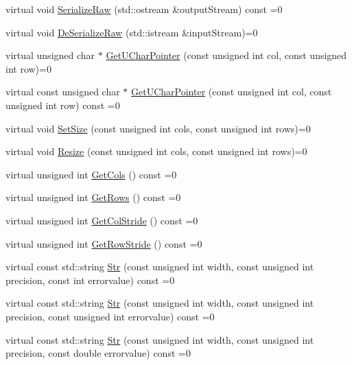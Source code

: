 \begin{DoxyCompactItemize}
\item 
virtual void \hyperlink{classsvl_sample_matrix_acd4b2584ba05baa047abebd0b074ce04}{Serialize\-Raw} (std\-::ostream \&output\-Stream) const =0
\item 
virtual void \hyperlink{classsvl_sample_matrix_aa57e6d8ca556b52e70b6e94e3e962cfd}{De\-Serialize\-Raw} (std\-::istream \&input\-Stream)=0
\item 
virtual unsigned char $\ast$ \hyperlink{classsvl_sample_matrix_a3796f625eb8a13b9ab34594c0bd6903f}{Get\-U\-Char\-Pointer} (const unsigned int col, const unsigned int row)=0
\item 
virtual const unsigned char $\ast$ \hyperlink{classsvl_sample_matrix_a85aed650f106fe6ba80a83c199f6e62b}{Get\-U\-Char\-Pointer} (const unsigned int col, const unsigned int row) const =0
\item 
virtual void \hyperlink{classsvl_sample_matrix_a05a7e2b19460721298dd6d7a89417ac0}{Set\-Size} (const unsigned int cols, const unsigned int rows)=0
\item 
virtual void \hyperlink{classsvl_sample_matrix_a4f8dad9eff0dec6a5b6b5d8485740ec6}{Resize} (const unsigned int cols, const unsigned int rows)=0
\item 
virtual unsigned int \hyperlink{classsvl_sample_matrix_aacea8828c46342864637f6255dd227dc}{Get\-Cols} () const =0
\item 
virtual unsigned int \hyperlink{classsvl_sample_matrix_a405709c0faf794990cb5adede9dfcbe2}{Get\-Rows} () const =0
\item 
virtual unsigned int \hyperlink{classsvl_sample_matrix_a533753ff374582e6672e57276cb5556d}{Get\-Col\-Stride} () const =0
\item 
virtual unsigned int \hyperlink{classsvl_sample_matrix_a8cd12553074481ae0955935476bfe783}{Get\-Row\-Stride} () const =0
\item 
virtual const std\-::string \hyperlink{classsvl_sample_matrix_ad5ceba0a2fd08724bb26a8f397fc9345}{Str} (const unsigned int width, const unsigned int precision, const int errorvalue) const =0
\item 
virtual const std\-::string \hyperlink{classsvl_sample_matrix_a09092eea578d4ea86be946cef83bfa1d}{Str} (const unsigned int width, const unsigned int precision, const unsigned int errorvalue) const =0
\item 
virtual const std\-::string \hyperlink{classsvl_sample_matrix_a77a4b024a006e79ca1e0f5b3769fe260}{Str} (const unsigned int width, const unsigned int precision, const double errorvalue) const =0
\item 

\end{DoxyCompactItemize}
